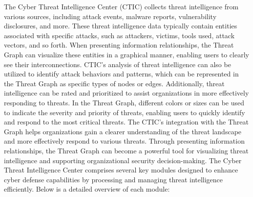 The Cyber Threat Intelligence Center (CTIC) collects threat intelligence from various sources, including attack events, malware reports, vulnerability disclosures, and more. These threat intelligence data typically contain entities associated with specific attacks, such as attackers, victims, tools used, attack vectors, and so forth. When presenting information relationships, the Threat Graph can visualize these entities in a graphical manner, enabling users to clearly see their interconnections. CTIC's analysis of threat intelligence can also be utilized to identify attack behaviors and patterns, which can be represented in the Threat Graph as specific types of nodes or edges. Additionally, threat intelligence can be rated and prioritized to assist organizations in more effectively responding to threats. In the Threat Graph, different colors or sizes can be used to indicate the severity and priority of threats, enabling users to quickly identify and respond to the most critical threats. The CTIC's integration with the Threat Graph helps organizations gain a clearer understanding of the threat landscape and more effectively respond to various threats. Through presenting information relationships, the Threat Graph can become a powerful tool for visualizing threat intelligence and supporting organizational security decision-making. The Cyber Threat Intelligence Center comprises several key modules designed to enhance cyber defense capabilities by processing and managing threat intelligence efficiently. Below is a detailed overview of each module:

